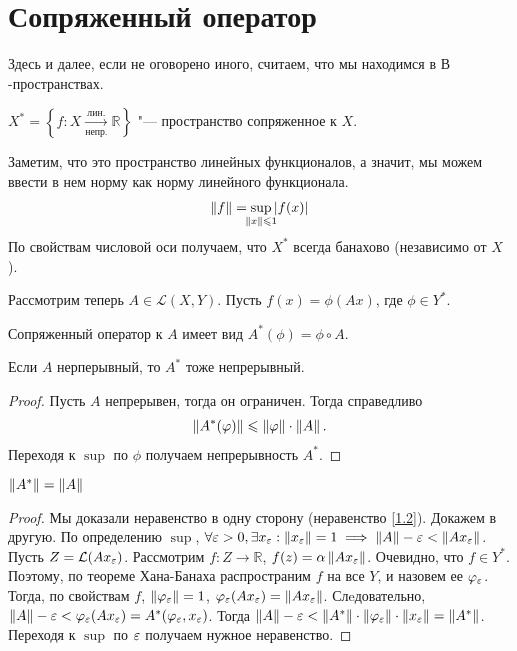 \section{Сопряженный оператор}

Здесь и далее, если не оговорено иного, считаем, что мы находимся в $В$-пространствах.

\begin{definition}
	$X^* = \left\{ f : X \xrightarrow[\text{непр.}]{\text{лин.}} \mathbb{R} \right\}$ "--- пространство сопряженное к $X$.
\end{definition}
Заметим, что это пространство линейных функционалов, а значит, мы можем ввести в нем норму как норму линейного функционала.
\begin{gather}
    \norm{f} = \sup_{\mathclap{\norm{x} \leqslant 1}} \abs{f(x)}  \\
\end{gather}
По свойствам числовой оси получаем, что $X^*$ всегда банахово (независимо от $X$).

Рассмотрим теперь $A \in \mathcal{L}(X, Y)$. Пусть $f(x) = \phi(Ax)$, где $\phi \in Y^*$.
\begin{definition}
	Сопряженный оператор к $A$ имеет вид $A^*(\phi) = \phi \circ A$.
\end{definition}
\begin{statement}
	Если $A$ нерперывный, то $A^*$ тоже непрерывный.
\end{statement}
\begin{proof}
	Пусть $A$ непрерывен, тогда он ограничен. Тогда справедливо
	\begin{gather}
        \left\|A^*(\varphi)\right\| \leqslant \left\|\varphi\right\| \cdot \left\|A\right\|\text{.} \label{1.2}
	\end{gather}
	Переходя к $\sup$ по $\phi$ получаем непрерывность $A^*$.
\end{proof}
\begin{theorem} \label{th1.2}
	$\left\|A^*\right\| = \left\|A\right\|$
\end{theorem}
\begin{proof}
	Мы доказали неравенство в одну сторону (неравенство \ref{1.2}). Докажем в другую.
	По определению $\sup$, $\forall \varepsilon > 0, \exists x_{\varepsilon} : \left\|x_{\varepsilon}\right\| = 1 \implies \left\|A\right\| - \varepsilon < \left\|Ax_{\varepsilon}\right\|$.
	Пусть $Z = \mathcal{L}(Ax_{\varepsilon})$. Рассмотрим $f : Z \rightarrow \mathbb{R}$, $f(z) = \alpha\left\|Ax_{\varepsilon}\right\|$.
    Очевидно, что $f \in Y^*$.
	Поэтому, по теореме Хана-Банаха распространим $f$ на все $Y$, и назовем ее $\varphi_{\varepsilon}$.
	Тогда, по свойствам $f$, $\left\|\varphi_{\varepsilon}\right\| = 1$, $\varphi_{\varepsilon}(Ax_{\varepsilon}) = \left\|Ax_{\varepsilon}\right\|$.
	Слeдовательно, $\left\|A\right\| - \varepsilon < \varphi_{\varepsilon}(Ax_{\varepsilon}) = A^*(\varphi_{\varepsilon}, x_{\varepsilon})$.
	Тогда $\left\|A\right\| - \varepsilon < \left\|A^*\right\| \cdot \left\|\varphi_{\varepsilon}\right\| \cdot \left\|x_{\varepsilon}\right\| = \left\|A^*\right\|$.
	Переходя к $\sup$ по $\varepsilon$ получаем нужное неравенство.
\end{proof}


